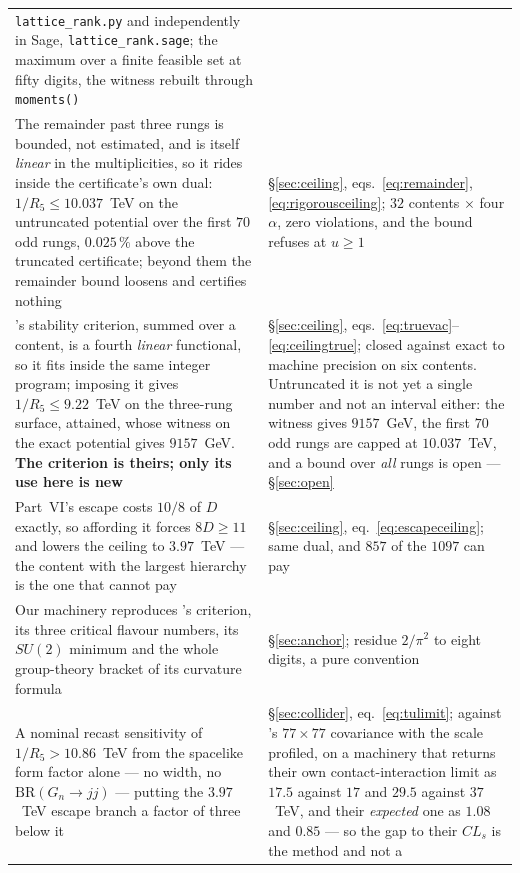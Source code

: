 \documentclass[11pt,a4paper]{article}
\newcommand{\su}[1]{SU(#1)}
\begin{document}
\begin{longtable}{p{}p{}}
\texttt{lattice\_\allowbreak rank.py} and independently in Sage,
\texttt{lattice\_\allowbreak rank.sage}; the maximum over a finite feasible set at fifty digits,
the witness rebuilt through \texttt{moments()}\\
The remainder past three rungs is bounded, not estimated, and is itself \emph{linear} in the
multiplicities, so it rides inside the certificate's own dual: $1/R_5\le10.037$~TeV on the
untruncated potential over the first $70$ odd rungs, $0.025\,\%$ above the truncated certificate;
beyond them the remainder bound loosens and certifies nothing & \S\ref{sec:ceiling},
eqs.~\eqref{eq:remainder}, \eqref{eq:rigorousceiling}; $32$ contents $\times$ four $\alpha$, zero
violations, and the bound refuses at $u\ge1$\\
\cite{CCD24}'s stability criterion, summed over a content, is a fourth \emph{linear} functional, so
it fits inside the same integer program; imposing it gives $1/R_5\le9.22$~TeV on the three-rung
surface, attained, whose witness on the exact potential gives $9157$~GeV. \textbf{The criterion is
theirs; only its use here is new} & \S\ref{sec:ceiling},
eqs.~\eqref{eq:truevac}--\eqref{eq:ceilingtrue}; closed against exact to machine precision on six
contents. Untruncated it is not yet a single number and not an interval either: the witness gives
$9157$~GeV, the first $70$ odd rungs are capped at $10.037$~TeV, and a bound over \emph{all} rungs
is open --- \S\ref{sec:open}\\
Part~VI's escape costs $10/8$ of $D$ exactly, so affording it forces $8D\ge11$ and lowers the
ceiling to $3.97$~TeV --- the content with the largest hierarchy is the one that cannot pay &
\S\ref{sec:ceiling}, eq.~\eqref{eq:escapeceiling}; same dual, and $857$ of the $1097$ can pay\\
Our machinery reproduces \cite{vGIQ}'s criterion, its three critical flavour numbers, its $\su2$
minimum and the whole group-theory bracket of its curvature formula & \S\ref{sec:anchor}; residue
$2/\pi^2$ to eight digits, a pure convention\\
A nominal recast sensitivity of $1/R_5>10.86$~TeV from the spacelike form factor alone --- no
width, no $\mathrm{BR}(G_n\to jj)$ --- putting the $3.97$~TeV escape branch a factor of three
below it & \S\ref{sec:collider}, eq.~\eqref{eq:tulimit}; against \cite{CMSangular}'s
$77\times77$ covariance with the scale profiled, on a machinery that returns their own
contact-interaction limit as $17.5$ against $17$ and $29.5$ against $37$~TeV, and their
\emph{expected} one as $1.08$ and $0.85$ --- so the gap to their $CL_s$ is the method and not a

\end{longtable}
\end{document}
